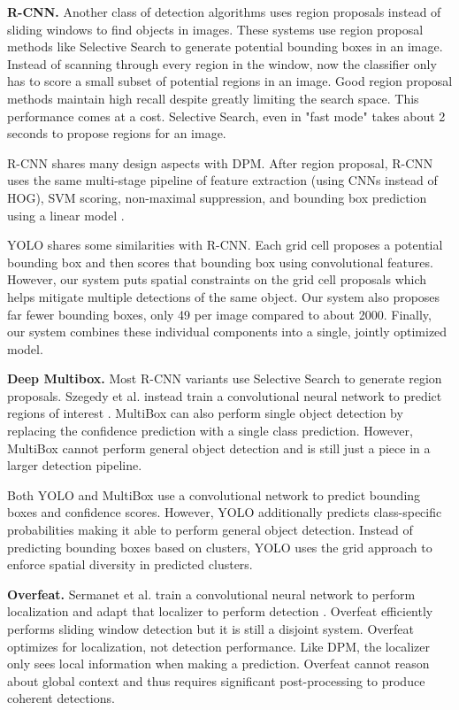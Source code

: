 \documentclass{article} %
\begin{document}
\textbf{R-CNN.} Another class of detection algorithms uses region proposals instead of sliding windows to find objects in images. These systems use region proposal methods like Selective Search \cite{uijlings2013selective} to generate potential bounding boxes in an image. Instead of scanning through every region in the window, now the classifier only has to score a small subset of potential regions in an image. Good region proposal methods maintain high recall despite greatly limiting the search space. This performance comes at a cost. Selective Search, even in "fast mode" takes about 2 seconds to propose regions for an image.

R-CNN shares many design aspects with DPM. After region proposal, R-CNN uses the same multi-stage pipeline of feature extraction (using CNNs instead of HOG), SVM scoring, non-maximal suppression, and bounding box prediction using a linear model \cite{girshick2014rich}. 

YOLO shares some similarities with R-CNN. Each grid cell proposes a potential bounding box and then scores that bounding box using convolutional features. However, our system puts spatial constraints on the grid cell proposals which helps mitigate multiple detections of the same object. Our system also proposes far fewer bounding boxes, only 49 per image compared to about 2000. Finally, our system combines these individual components into a single, jointly optimized model.

\textbf{Deep Multibox.} Most R-CNN variants use Selective Search to generate region proposals. Szegedy et al. instead train a convolutional neural network to predict regions of interest \cite{erhan2014scalable}. MultiBox can also perform single object detection by replacing the confidence prediction with a single class prediction. However, MultiBox cannot perform general object detection and is still just a piece in a larger detection pipeline.

Both YOLO and MultiBox use a convolutional network to predict bounding boxes and confidence scores. However, YOLO additionally predicts class-specific probabilities making it able to perform general object detection. Instead of predicting bounding boxes based on clusters, YOLO uses the grid approach to enforce spatial diversity in predicted clusters.

\textbf{Overfeat.} Sermanet et al. train a convolutional neural network to perform localization and adapt that localizer to perform detection \cite{DBLP:journals/corr/SermanetEZMFL13}. Overfeat efficiently performs sliding window detection but it is still a disjoint system. Overfeat optimizes for localization, not detection performance. Like DPM, the localizer only sees local information when making a prediction. Overfeat cannot reason about global context and thus requires significant post-processing to produce coherent detections.
\end{document}
